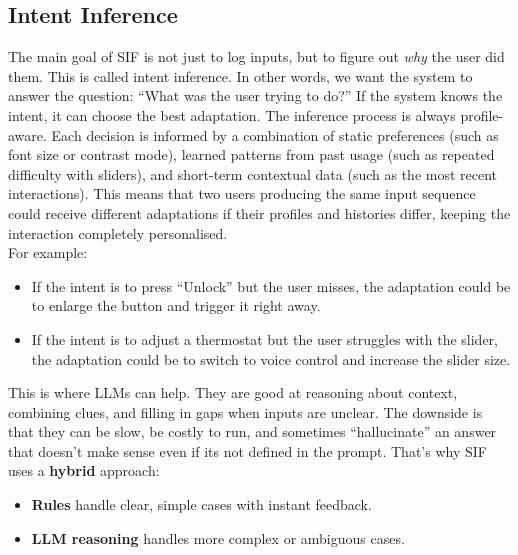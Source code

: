 \documentclass[openany]{book}
\begin{document}
\subsection{Intent Inference}
The main goal of SIF is not just to log inputs, but to figure out \textit{why} the user did them. This is called intent inference. In other words, we want the system to answer the question: “What was the user trying to do?”
If the system knows the intent, it can choose the best adaptation. The inference process is always profile-aware. Each decision is informed by a combination of static preferences (such as font size or contrast mode), learned patterns from past usage (such as repeated difficulty with sliders), and short-term contextual data (such as the most recent interactions). This means that two users producing the same input sequence could receive different adaptations if their profiles and histories differ, keeping the interaction completely personalised. 
\\For example:
\begin{itemize}
    \item If the intent is to press “Unlock” but the user misses, the adaptation could be to enlarge the button and trigger it right away.
    \item If the intent is to adjust a thermostat but the user struggles with the slider, the adaptation could be to switch to voice control and increase the slider size.
\end{itemize}

This is where LLMs can help. They are good at reasoning about context, combining clues, and filling in gaps when inputs are unclear. The downside is that they can be slow, be costly to run, and sometimes “hallucinate” an answer that doesn’t make sense even if its not defined in the prompt. That’s why SIF uses a \textbf{hybrid} approach:
\begin{itemize}
    \item \textbf{Rules} handle clear, simple cases with instant feedback.
    \item \textbf{LLM reasoning} handles more complex or ambiguous cases.
\end{itemize}
\end{document}
